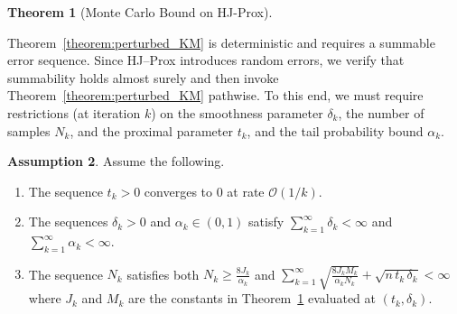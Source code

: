 \documentclass{article}
\theoremstyle{plain}
\newtheorem{theorem}{Theorem}[section]
\theoremstyle{definition}
\newtheorem{assumption}[theorem]{Assumption}
\theoremstyle{remark}
\begin{document}
\begin{theorem}[Monte Carlo Bound on HJ-Prox]
\label{thm:hj_prox_error_bound_mc}
\end{theorem}
Theorem~\ref{theorem:perturbed_KM} is deterministic and requires a summable error sequence. 
Since HJ–Prox introduces random errors, we verify that summability holds almost surely and then invoke Theorem~\ref{theorem:perturbed_KM} pathwise. To this end, we must require restrictions (at iteration $k$) on the smoothness parameter $\delta_k$, the number of samples $N_k$, and the proximal parameter $t_k$, and the tail probability bound $\alpha_k$.

\newcommand{\changingtAssumption}[1]{
Assume the following.
\begin{enumerate}[nosep,leftmargin=*]
    \item The sequence $t_k >0$ converges to 0 at rate $\mathcal{O}(1/k)$. 
    \item The sequences $\delta_k > 0$ and $\alpha_k \in (0,1)$ satisfy $\sum_{k=1}^\infty \delta_k < \infty$ and $\sum_{k=1}^\infty \alpha_k < \infty$.
    \item The sequence $N_k$ satisfies both $N_k \geq \frac{8 J_{k}}{\alpha_k}$ and $\sum_{k=1}^\infty \sqrt{\frac{8 J_k M_k}{\alpha_k N_k}}
        +
        \sqrt{n\,t_k\,\delta_k} < \infty$ where $J_k$ and $M_k$ are the constants in Theorem~\ref{thm:hj_prox_error_bound_mc} evaluated at $(t_k,\delta_k)$.
\end{enumerate}
}
\newcommand{\fixedtAssumption}[1]{
Fix $t > 0$ and assume the following.
\begin{enumerate}[nosep,leftmargin=*]
    \item The sequences $\sqrt{\delta_k} > 0$ and $\alpha_k \in (0,1)$ satisfy $\sum_{k=1}^\infty \sqrt{\delta_k} < \infty$ and $\sum_{k=1}^\infty \alpha_k < \infty$. 
   \item The sequence $N_k$ satisfies both $N_k \geq \frac{8 J_{k}}{\alpha_k}$ and $\sum_{k=1}^\infty \sqrt{\frac{8 J_k M_k}{\alpha_k N_k}}
        +
        \sqrt{n\,t\,\delta_k} < \infty$ where $J_k$ and $M_k$ are the constants in Theorem~\ref{thm:hj_prox_error_bound_mc} evaluated at $\delta_k$.
\end{enumerate}
}

\begin{assumption}
    \changingtAssumption{main}
    \label{assump: changeing t}
\end{assumption}
\end{document}
